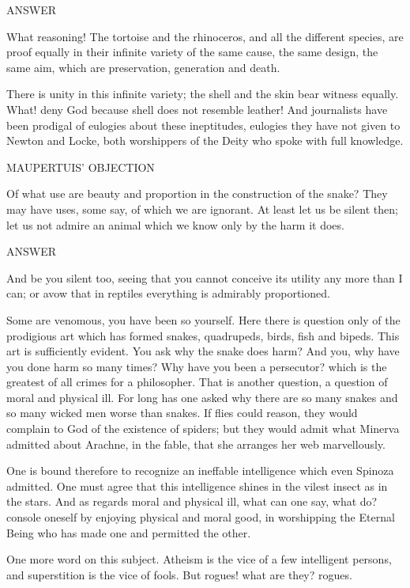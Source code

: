 \noindent
ANSWER

What reasoning! The tortoise and the rhinoceros, and all the different
species, are proof equally in their infinite variety of the same cause,
the same design, the same aim, which are preservation, generation and
death.

There is unity in this infinite variety; the shell and the skin bear
witness equally. What! deny God because shell does not resemble leather!
And journalists have been prodigal of eulogies about these ineptitudes,
eulogies they have not given to Newton and Locke, both worshippers of
the Deity who spoke with full knowledge.

\noindent
MAUPERTUIS' OBJECTION

Of what use are beauty and proportion in the construction of the snake?
They may have uses, some say, of which we are ignorant. At least let us
be silent then; let us not admire an animal which we know only by the
harm it does.

\noindent
ANSWER

And be you silent too, seeing that you cannot conceive its utility any
more than I can; or avow that in reptiles everything is admirably
proportioned.

Some are venomous, you have been so yourself. Here there is question
only of the prodigious art which has formed snakes, quadrupeds, birds,
fish and bipeds. This art is sufficiently evident. You ask why the snake
does harm? And you, why have you done harm so many times? Why have you
been a persecutor? which is the greatest of all crimes for a
philosopher. That is another question, a question of moral and physical
ill. For long has one asked why there are so many snakes and so many
wicked men worse than snakes. If flies could reason, they would complain
to God of the existence of spiders; but they would admit what Minerva
admitted about Arachne, in the fable, that she arranges her web
marvellously.

One is bound therefore to recognize an ineffable intelligence which even
Spinoza admitted. One must agree that this intelligence shines in the
vilest insect as in the stars. And as regards moral and physical ill,
what can one say, what do? console oneself by enjoying physical and
moral good, in worshipping the Eternal Being who has made one and
permitted the other.

One more word on this subject. Atheism is the vice of a few intelligent
persons, and superstition is the vice of fools. But rogues! what are
they? rogues.


